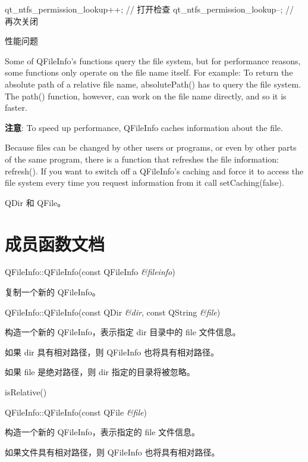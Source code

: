 \begin{cppcode}
qt_ntfs_permission_lookup++; // 打开检查
qt_ntfs_permission_lookup--; // 再次关闭
\end{cppcode}

性能问题

Some of QFileInfo's functions query the file system, but for performance reasons, some functions only operate on the file name itself. For example: To return the absolute path of a relative file name, absolutePath() has to query the file system. The path() function, however, can work on the file name directly, and so it is faster.

\textbf{注意}: To speed up performance, QFileInfo caches information about the file.

Because files can be changed by other users or programs, or even by other parts of the same program, there is a function that refreshes the file information: refresh(). If you want to switch off a QFileInfo's caching and force it to access the file system every time you request information from it call setCaching(false).


\begin{seeAlso}
QDir 和 QFile。
\end{seeAlso}

\splitLine 

\section{成员函数文档}

QFileInfo::QFileInfo(const QFileInfo \emph{\&fileinfo})

复制一个新的 QFileInfo。

QFileInfo::QFileInfo(const QDir \emph{\&dir}, const QString \emph{\&file})

构造一个新的 QFileInfo，表示指定 dir 目录中的 file 文件信息。

如果 dir 具有相对路径，则 QFileInfo 也将具有相对路径。

如果 file 是绝对路径，则 dir 指定的目录将被忽略。

\begin{seeAlso}
 isRelative()
\end{seeAlso}


QFileInfo::QFileInfo(const QFile \emph{\&file})

构造一个新的 QFileInfo，表示指定的 file 文件信息。

如果文件具有相对路径，则 QFileInfo 也将具有相对路径。

